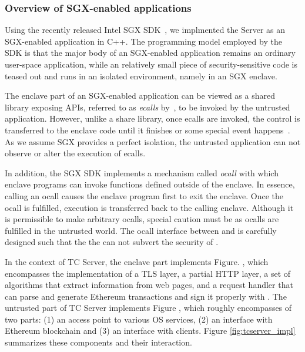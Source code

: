 
\subsubsection{Overview of SGX-enabled applications}

Using the recently released Intel SGX SDK~\cite{sgxsdk}, we implmented the \tc
Server as an SGX-enabled application in C++. The programming model employed by
the SDK is that the major body of an SGX-enabled application remains an
ordinary user-space application, while an relatively small piece of security-sensitive code
is teased out and runs in an isolated environment, namely in an SGX enclave.

The enclave part of an SGX-enabled application can be
viewed as a shared library exposing APIs, referred to as \emph{ecalls} by~\cite{sgxsdk},
to be invoked by the untrusted application. However, unlike a share library,  
once ecalls are invoked, the control is transferred to the 
enclave code until it finishes or some special event happens~\cite{sgxmanual}.
As we assume SGX provides a perfect isolation, the untrusted application can not
observe or alter the execution of ecalls.

In addition, the SGX SDK implements a mechanism called \emph{ocall} with which enclave
programs can invoke functions defined outside of the enclave. In essence,
calling an ocall causes the enclave program first to exit the enclave. Once the
ocall is fulfilled, execution is transferred back to the calling enclave. 
Although it is permissible to make arbitrary ocalls, special caution must be 
as ocalls are fulfilled in the untrusted world.
The ocall interface between \encname and \medname is carefully designed such that the 
the \medname can not subvert the security of \tc.

In the context of TC Server, the enclave part implements Figure. , which encompasses the implementation of a TLS layer, a partial HTTP
layer, a set of algorithms that extract information from web pages, and a
request handler that can parse and generate Ethereum transactions and sign it
properly with \skTC.  The untrusted part of TC Server implements Figure , which roughly encompasses of two parts: (1) an access point to various
OS services, (2) an interface with Ethereum blockchain and (3) an interface with
clients. Figure \ref{fig:tcserver_impl} summarizes these components and their
interaction.

